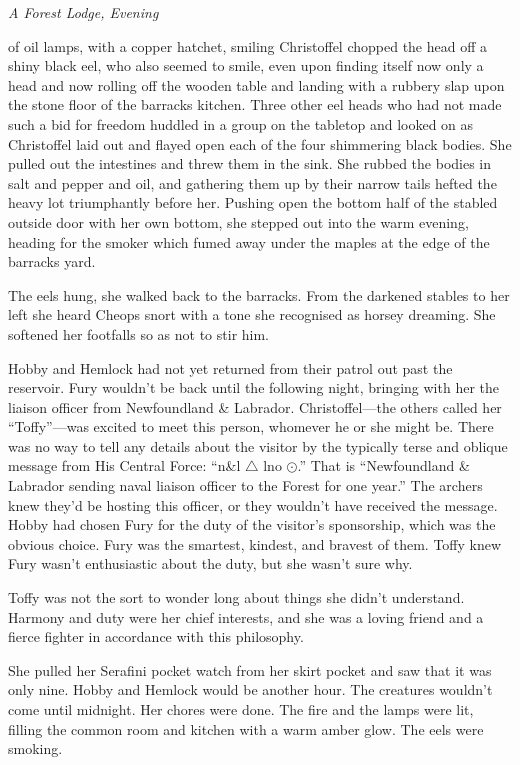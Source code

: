 \documentclass[11pt,a5paper]{article}
\newcommand{\alet}[1]{\textit{#1}\vspace{1em}}
\begin{document}
\alet{A Forest Lodge, Evening}

 of oil lamps, with a copper hatchet, smiling Christoffel chopped the head off a shiny black eel, who also seemed to smile, even upon finding itself now only a head and now rolling off the wooden table and landing with a rubbery slap upon the stone floor of the barracks kitchen. Three other eel heads who had not made such a bid for freedom huddled in a group on the tabletop and looked on as Christoffel laid out and flayed open each of the four shimmering black bodies. She pulled out the intestines and threw them in the sink. She rubbed the bodies in salt and pepper and oil, and gathering them up by their narrow tails hefted the heavy lot triumphantly before her. Pushing open the bottom half of the stabled outside door with her own bottom, she stepped out into the warm evening, heading for the smoker which fumed away under the maples at the edge of the barracks yard.

The eels hung, she walked back to the barracks. From the darkened stables to her left she heard Cheops snort with a tone she recognised as horsey dreaming. She softened her footfalls so as not to stir him.

Hobby and Hemlock had not yet returned from their patrol out past the reservoir. Fury wouldn't be back until the following night, bringing with her the liaison officer from Newfoundland \& Labrador. Christoffel---the others called her ``Toffy''---was excited to meet this person, whomever he or she might be. There was no way to tell any details about the visitor by the typically terse and oblique message from His Central Force: ``{\sc n\&l} $\triangle$ {\sc lno} $\odot$.'' That is ``Newfoundland \& Labrador sending naval liaison officer to the Forest for one year.'' The archers knew they'd be hosting this officer, or they wouldn't have received the message. Hobby had chosen Fury for the duty of the visitor's sponsorship, which was the obvious choice. Fury was the smartest, kindest, and bravest of them. Toffy knew Fury wasn't enthusiastic about the duty, but she wasn't sure why.

Toffy was not the sort to wonder long about things she didn't understand. Harmony and duty were her chief interests, and she was a loving friend and a fierce fighter in accordance with this philosophy.

She pulled her Serafini pocket watch from her skirt pocket and saw that it was only nine. Hobby and Hemlock would be another hour. The creatures wouldn't come until midnight. Her chores were done. The fire and the lamps were lit, filling the common room and kitchen with a warm amber glow. The eels were smoking.
\end{document}

